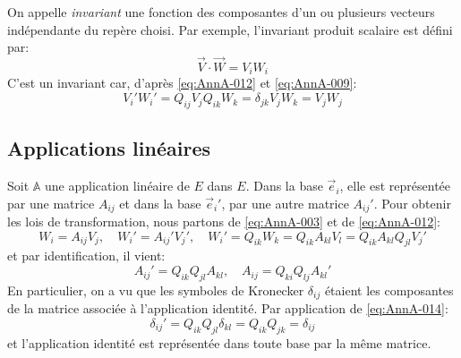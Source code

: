 On appelle \emph{invariant} une fonction des composantes d'un ou plusieurs vecteurs indépendante du repère choisi.
Par exemple, l'invariant produit scalaire est défini par:
\begin{equation}
    \vec{V}\cdot \vec{W} = V_i W_i
    \label{eq:AnnA-013}
\end{equation}
C'est un invariant car, d'après \eqref{eq:AnnA-012} et \eqref{eq:AnnA-009}:
\begin{displaymath}
    V_i' W_i' = Q_{ij} V_j Q_{ik} W_k = \delta_{jk} V_j W_k = V_j W_j
\end{displaymath}
\subsection{Applications linéaires}
Soit $\mathbb{A}$ une application linéaire de $E$ dans $E$. 
Dans la base $\vec{e}_i$, elle est représentée par une matrice $A_{ij}$ et dans la base $\vec{e}_i{}'$, par une autre matrice $A_{ij}'$.
Pour obtenir les lois de transformation, nous partons de \eqref{eq:AnnA-003} et de \eqref{eq:AnnA-012}:
\begin{equation}
    W_i = A_{ij} V_j, \quad W_i' = A_{ij}' V_j',\quad
    W_i' = Q_{ik} W_k = Q_{ik} A_{kl} V_l = Q_{ik} A_{kl} Q_{jl} V_{j}'
\end{equation}
et par identification, il vient:
\begin{equation}
    A_{ij}' = Q_{ik} Q_{jl} A_{kl}, \quad A_{ij} = Q_{ki} Q_{lj} A_{kl}'
    \label{eq:AnnA-014}
\end{equation}
En particulier, on a vu que les symboles de Kronecker $\delta_{ij}$ étaient les composantes de la matrice associée à l'application identité. 
Par application de \eqref{eq:AnnA-014}:
\begin{equation}
    \delta_{ij}' = Q_{ik} Q_{jl} \delta_{kl} = Q_{ik} Q_{jk} = \delta_{ij}
    \label{eq:AnnA-015}
\end{equation}
et l'application identité est représentée dans toute base par la même matrice.
